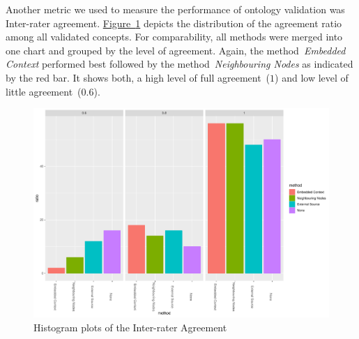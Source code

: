 Another metric we used to measure the performance of ontology validation was Inter-rater agreement. 
\hyperref[fig:hist_agreement_finance_all]{Figure~\ref*{fig:hist_agreement_finance_all}} depicts the distribution of the agreement ratio among all validated concepts. For comparability, all methods were merged into one chart and grouped by the level of agreement. Again, the method~\emph{Embedded Context} performed best followed by the method~\emph{Neighbouring Nodes} as indicated by the red bar. It shows both, a high level of full agreement~($1$) and low level of little agreement~($0.6$). 
\begin{figure}
  	 \includegraphics[width=\textwidth]{plots/finance/hist_agreement}
  	 \caption{Histogram plots of the Inter-rater Agreement}\label{fig:hist_agreement_finance_all}
\end{figure}
 
